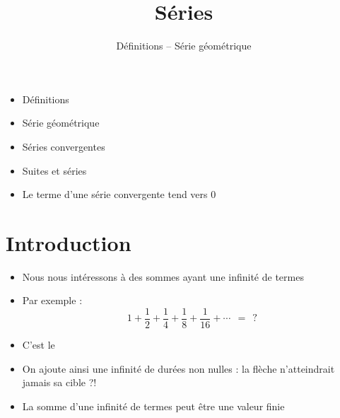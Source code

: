 


   





\title{{\bf Séries}}
\subtitle{Définitions -- Série géométrique}

\begin{frame}
  
  \debutmontitre

  \pause

{\footnotesize
\hfill
{}
\begin{minipage}{0.6\textwidth}
  \begin{itemize}
    \item<3-> Définitions
    \item<4-> Série géométrique
    \item<5-> Séries convergentes
    \item<6-> Suites et séries
    \item<7-> Le terme d'une série convergente tend vers $0$
  \end{itemize}
\end{minipage}
}

\end{frame}

\setcounter{framenumber}{0}



\section{Introduction}

\begin{frame}

\begin{itemize}
\item Nous nous intéressons à des sommes ayant une infinité de termes
\item\pause Par exemple :
\[1+\frac{1}{2} +\frac{1}{4} +\frac{1}{8}+\frac{1}{16} +\cdots \ \ = \ \ ? \]

\item\pause C'est le 
\pause
{}

\item\pause On ajoute ainsi une infinité de durées non nulles : la flèche n'atteindrait jamais sa cible ?!
\item\pause La somme d'une infinité de termes peut être une valeur finie
\end{itemize}

\end{frame}


